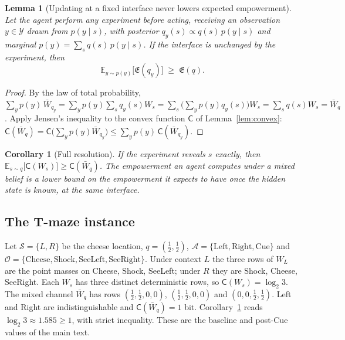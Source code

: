 \documentclass[pdflatex,sn-apa]{sn-jnl}%
\newtheorem{lemma}{Lemma}
\newtheorem{corollary}{Corollary}
\theoremstyle{definition}
\providecommand{\E}{\mathbb{E}}
\providecommand{\cA}{\mathcal{A}}
\providecommand{\cO}{\mathcal{O}}
\providecommand{\cS}{\mathcal{S}}
\providecommand{\Emp}{\mathfrak{E}}
\providecommand{\Capa}{\mathsf{C}}
\begin{document}
\begin{appendices}
\begin{lemma}[Updating at a fixed interface never lowers expected empowerment]
\label{lem:update}
Let the agent perform any experiment before acting, receiving an observation $y \in \mathcal{Y}$ drawn from $p(y \mid s)$, with posterior $q_y(s) \propto q(s)\, p(y \mid s)$ and marginal $p(y) = \sum_s q(s)\, p(y \mid s)$. If the interface is unchanged by the experiment, then
\begin{equation}
  \E_{y \sim p(y)}\big[\Emp(q_y)\big] \;\ge\; \Emp(q).
  \label{eq:update}
\end{equation}
\end{lemma}
\begin{proof}
By the law of total probability, $\sum_y p(y)\, \bar W_{q_y} = \sum_y p(y) \sum_s q_y(s) W_s = \sum_s \big(\sum_y p(y) q_y(s)\big) W_s = \sum_s q(s) W_s = \bar W_q$. Apply Jensen's inequality to the convex function $\Capa$ of Lemma~\ref{lem:convex}: $\Capa(\bar W_q) = \Capa\big(\sum_y p(y) \bar W_{q_y}\big) \le \sum_y p(y)\, \Capa(\bar W_{q_y})$.
\end{proof}

\begin{corollary}[Full resolution]
\label{cor:resolve}
If the experiment reveals $s$ exactly, then $\E_{s \sim q}\big[\Capa(W_s)\big] \ge \Capa(\bar W_q)$. The empowerment an agent computes under a mixed belief is a lower bound on the empowerment it expects to have once the hidden state is known, at the same interface.
\end{corollary}

\subsection*{The T-maze instance}
Let $\cS = \{L, R\}$ be the cheese location, $q = (\tfrac12, \tfrac12)$, $\cA = \{\text{Left}, \text{Right}, \text{Cue}\}$ and $\cO = \{\text{Cheese}, \text{Shock}, \text{SeeLeft}, \text{SeeRight}\}$. Under context $L$ the three rows of $W_L$ are the point masses on Cheese, Shock, SeeLeft; under $R$ they are Shock, Cheese, SeeRight. Each $W_s$ has three distinct deterministic rows, so $\Capa(W_s) = \log_2 3$. The mixed channel $\bar W_q$ has rows $(\tfrac12, \tfrac12, 0, 0)$, $(\tfrac12, \tfrac12, 0, 0)$ and $(0, 0, \tfrac12, \tfrac12)$. Left and Right are indistinguishable and $\Capa(\bar W_q) = 1$ bit. Corollary~\ref{cor:resolve} reads $\log_2 3 \approx 1.585 \ge 1$, with strict inequality. These are the baseline and post-Cue values of the main text.


\end{appendices}
\end{document}
